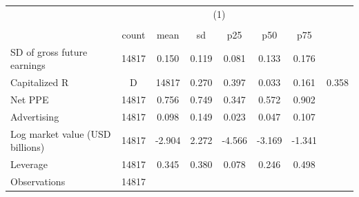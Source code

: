 {
\def\sym#1{\ifmmode^{#1}\else\(^{#1}\)\fi}
\begin{tabular}{l*{1}{cccccc}}
\hline\hline
                    &                                                      \\
                    &                                                         \\
                    &       count&        mean&          sd&         p25&         p50&         p75\\
\hline
SD of gross future earnings&       14817&       0.150&       0.119&       0.081&       0.133&       0.176\\
Capitalized R&D     &       14817&       0.270&       0.397&       0.033&       0.161&       0.358\\
Net PPE             &       14817&       0.756&       0.749&       0.347&       0.572&       0.902\\
Advertising         &       14817&       0.098&       0.149&       0.023&       0.047&       0.107\\
Log market value (USD billions)&       14817&      -2.904&       2.272&      -4.566&      -3.169&      -1.341\\
Leverage            &       14817&       0.345&       0.380&       0.078&       0.246&       0.498\\
\hline
Observations        &       14817&            &            &            &            &            \\
\hline\hline
\end{tabular}
}
